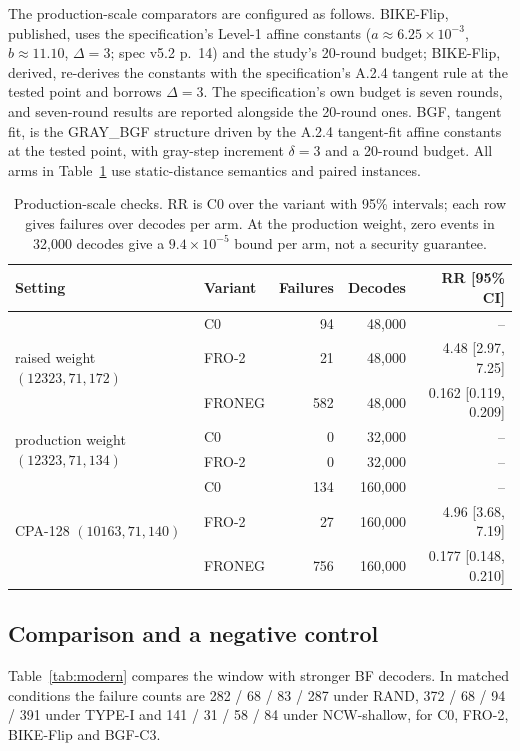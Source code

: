 \documentclass[letterpaper,journal]{IEEEtran}
\begin{document}
The production-scale comparators are configured as follows. BIKE-Flip, published, uses the specification's Level-1 affine constants ($a\approx6.25\times10^{-3}$, $b\approx11.10$, $\Delta=3$; spec v5.2 p.~14) and the study's 20-round budget; BIKE-Flip, derived, re-derives the constants with the specification's A.2.4 tangent rule at the tested point and borrows $\Delta=3$. The specification's own budget is seven rounds, and seven-round results are reported alongside the 20-round ones. BGF, tangent fit, is the GRAY\_BGF structure driven by the A.2.4 tangent-fit affine constants at the tested point, with gray-step increment $\delta=3$ and a 20-round budget. All arms in Table~\ref{tab:added} use static-distance semantics and paired instances.

\begin{table}[!t]
\centering
\small
\caption{Production-scale checks. RR is C0 over the variant with 95\% intervals; each row gives failures over decodes per arm. At the production weight, zero events in 32{,}000 decodes give a $9.4\times10^{-5}$ bound per arm, not a security guarantee.}
\label{tab:added}
\begin{tabular}{llrrr}
\toprule
Setting & Variant & Failures & Decodes & RR [95\% CI] \\
\midrule
\multirow{3}{*}{raised weight $(12323,71,172)$} & C0 & 94 & 48{,}000 & -- \\
 & FRO-2 & 21 & 48{,}000 & 4.48 [2.97, 7.25] \\
 & FRONEG & 582 & 48{,}000 & 0.162 [0.119, 0.209] \\
\midrule
\multirow{2}{*}{production weight $(12323,71,134)$} & C0 & 0 & 32{,}000 & -- \\
 & FRO-2 & 0 & 32{,}000 & -- \\
\midrule
\multirow{3}{*}{CPA-128 $(10163,71,140)$} & C0 & 134 & 160{,}000 & -- \\
 & FRO-2 & 27 & 160{,}000 & 4.96 [3.68, 7.19] \\
 & FRONEG & 756 & 160{,}000 & 0.177 [0.148, 0.210] \\
\bottomrule
\end{tabular}
\end{table}

\subsection{Comparison and a negative control}\label{sec:modern}

Table~\ref{tab:modern} compares the window with stronger BF decoders. In matched conditions the failure counts are 282 / 68 / 83 / 287 under RAND, 372 / 68 / 94 / 391 under TYPE-I and 141 / 31 / 58 / 84 under NCW-shallow, for C0, FRO-2, BIKE-Flip and BGF-C3.
\end{document}
